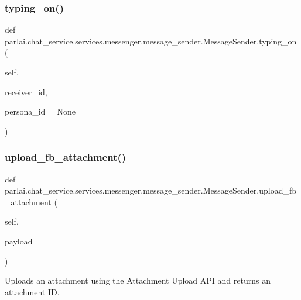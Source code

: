 \subsubsection{\texorpdfstring{typing\+\_\+on()}{typing\_on()}}
{\footnotesize\ttfamily def parlai.\+chat\+\_\+service.\+services.\+messenger.\+message\+\_\+sender.\+Message\+Sender.\+typing\+\_\+on (\begin{DoxyParamCaption}\item[{}]{self,  }\item[{}]{receiver\+\_\+id,  }\item[{}]{persona\+\_\+id = {\ttfamily None} }\end{DoxyParamCaption})}

\mbox{\label{classparlai_1_1chat__service_1_1services_1_1messenger_1_1message__sender_1_1MessageSender_a7b12a4f091ba64baa59c0749f8531190}} 
\subsubsection{\texorpdfstring{upload\+\_\+fb\+\_\+attachment()}{upload\_fb\_attachment()}}
{\footnotesize\ttfamily def parlai.\+chat\+\_\+service.\+services.\+messenger.\+message\+\_\+sender.\+Message\+Sender.\+upload\+\_\+fb\+\_\+attachment (\begin{DoxyParamCaption}\item[{}]{self,  }\item[{}]{payload }\end{DoxyParamCaption})}

\begin{DoxyVerb}Uploads an attachment using the Attachment Upload API and returns an attachment
ID.
\end{DoxyVerb}
 

